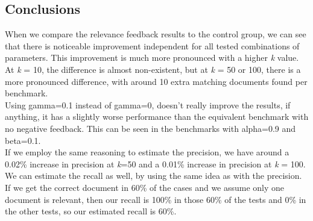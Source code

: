 \documentclass{article}
\begin{document}
\subsection{Conclusions}
When we compare the relevance feedback results to the control group, we can see that there is noticeable improvement independent for all tested combinations of parameters. This improvement is much more pronounced with a higher \textit{k} value. At \textit{k} = 10, the difference is almost non-existent, but at \textit{k} = 50 or 100, there is a more pronounced difference, with around 10 extra matching documents found per benchmark.\\

Using gamma=0.1 instead of gamma=0, doesn't really improve the results, if anything, it has a slightly worse performance than the equivalent benchmark with no negative feedback. This can be seen in the benchmarks with alpha=0.9 and beta=0.1. \\ 

If we employ the same reasoning to estimate the precision, we have around a 0.02\% increase in precision at \textit{k}=50 and a 0.01\% increase in precision at \textit{k} = 100. We can estimate the recall as well, by using the same idea as with the precision. If we get the correct document in 60\% of the cases and we assume only one document is relevant, then our recall is 100\% in those 60\% of the tests and 0\% in the other tests, so our estimated recall is  60\%.
\end{document}
